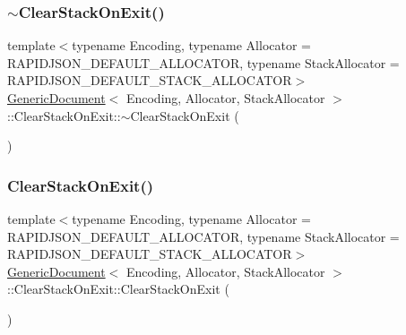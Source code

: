 \mbox{\label{structGenericDocument_1_1ClearStackOnExit_aa51248f341ec130a29e4f8c3705c9312}} 
\subsubsection{\texorpdfstring{$\sim$\+Clear\+Stack\+On\+Exit()}{~ClearStackOnExit()}}
{\footnotesize\ttfamily template$<$typename Encoding, typename Allocator = R\+A\+P\+I\+D\+J\+S\+O\+N\+\_\+\+D\+E\+F\+A\+U\+L\+T\+\_\+\+A\+L\+L\+O\+C\+A\+T\+OR, typename Stack\+Allocator = R\+A\+P\+I\+D\+J\+S\+O\+N\+\_\+\+D\+E\+F\+A\+U\+L\+T\+\_\+\+S\+T\+A\+C\+K\+\_\+\+A\+L\+L\+O\+C\+A\+T\+OR$>$ \\
\hyperlink{classGenericDocument}{Generic\+Document}$<$ Encoding, Allocator, Stack\+Allocator $>$\+::Clear\+Stack\+On\+Exit\+::$\sim$\+Clear\+Stack\+On\+Exit (\begin{DoxyParamCaption}{ }\end{DoxyParamCaption})\hspace{0.3cm}{\ttfamily [inline]}}

\mbox{\label{structGenericDocument_1_1ClearStackOnExit_ae009d5d42300fb5790227d24b4b38921}} 
\subsubsection{\texorpdfstring{Clear\+Stack\+On\+Exit()}{ClearStackOnExit()}\hspace{0.1cm}{\footnotesize\ttfamily [2/2]}}
{\footnotesize\ttfamily template$<$typename Encoding, typename Allocator = R\+A\+P\+I\+D\+J\+S\+O\+N\+\_\+\+D\+E\+F\+A\+U\+L\+T\+\_\+\+A\+L\+L\+O\+C\+A\+T\+OR, typename Stack\+Allocator = R\+A\+P\+I\+D\+J\+S\+O\+N\+\_\+\+D\+E\+F\+A\+U\+L\+T\+\_\+\+S\+T\+A\+C\+K\+\_\+\+A\+L\+L\+O\+C\+A\+T\+OR$>$ \\
\hyperlink{classGenericDocument}{Generic\+Document}$<$ Encoding, Allocator, Stack\+Allocator $>$\+::Clear\+Stack\+On\+Exit\+::\+Clear\+Stack\+On\+Exit (\begin{DoxyParamCaption}\item[{const \hyperlink{structGenericDocument_1_1ClearStackOnExit}{Clear\+Stack\+On\+Exit} \&}]{ }\end{DoxyParamCaption})\hspace{0.3cm}{\ttfamily [private]}}



